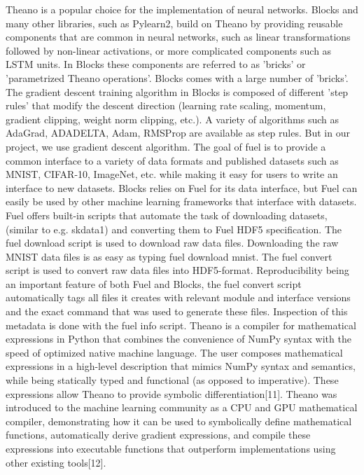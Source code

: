 \documentclass[runningheads,a4paper]{llncs}
\begin{document}
Theano is a popular choice for the implementation of neural networks. Blocks and many other libraries, such as Pylearn2, build on Theano by providing reusable components that are common in neural networks, such as linear transformations followed by non-linear activations, or more complicated components such as LSTM units. In Blocks these components are referred to as 'bricks' or 'parametrized Theano operations'. 
Blocks comes with a large number of 'bricks'. 
The gradient descent training algorithm in Blocks is composed of different 'step rules' that modify the descent direction (learning rate scaling, momentum, gradient clipping, weight norm clipping, etc.). A variety of algorithms such as AdaGrad, ADADELTA, Adam, RMSProp are available as step rules. But in our project, we use gradient descent algorithm.
The goal of fuel is to provide a common interface to a variety of data formats and published datasets such as MNIST, CIFAR-10, ImageNet, etc. while making it easy for users to write an interface to new datasets. 
Blocks relies on Fuel for its data interface, but Fuel can easily be used by other machine learning frameworks that interface with datasets. 
Fuel offers built-in scripts that automate the task of downloading datasets, (similar to e.g. skdata1) and converting them to Fuel HDF5 specification. 
The fuel download script is used to download raw data files. Downloading the raw MNIST data files is as easy as typing fuel download mnist. The fuel convert script is used to convert raw data files into HDF5-format. 
Reproducibility being an important feature of both Fuel and Blocks, the fuel convert script automatically tags all files it creates with relevant module and interface versions and the exact command that was used to generate these files. Inspection of this metadata is done with the fuel info script. 
Theano is a compiler for mathematical expressions in Python that combines the convenience of NumPy syntax with the speed of optimized native machine language. The user composes mathematical expressions in a high-level description that mimics NumPy syntax and semantics, while being statically typed and functional (as opposed to imperative). These expressions allow Theano to provide symbolic differentiation[11].
Theano was introduced to the machine learning community as a CPU and GPU mathematical compiler, demonstrating how it can be used to symbolically define mathematical functions, automatically derive gradient expressions, and compile these expressions into executable functions that outperform implementations using other existing tools[12].
\end{document}
